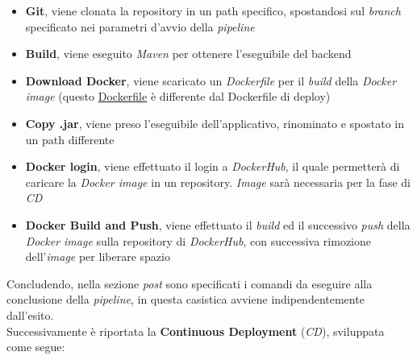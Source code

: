 \documentclass{article}
\begin{document}
\begin{itemize}[label = {-}]
    \itemsep0em
    \item \textbf{Git}, viene clonata la repository in un path specifico, spostandosi sul \textit{branch} specificato nei parametri d'avvio della \textit{pipeline}
    \item \textbf{Build}, viene eseguito \textit{Maven} per ottenere l'eseguibile del backend
    \item \textbf{Download Docker}, viene scaricato un \textit{Dockerfile} per il \textit{build} della \textit{Docker image} (questo \href{https://github.com/DavideDeRosa/storJ_SWE/blob/develop/CI_CD/Dockerfile}{Dockerfile} è differente dal Dockerfile di deploy)
    \item \textbf{Copy .jar}, viene preso l'eseguibile dell'applicativo, rinominato e spostato in un path differente
    \item \textbf{Docker login}, viene effettuato il login a \textit{DockerHub}, il quale permetterà di caricare la \textit{Docker image} in un repository. \textit{Image} sarà necessaria per la fase di \textit{CD}
    \item \textbf{Docker Build and Push}, viene effettuato il \textit{build} ed il successivo \textit{push} della \textit{Docker image} sulla repository di \textit{DockerHub}, con successiva rimozione dell'\textit{image} per liberare spazio
\end{itemize}
Concludendo, nella sezione \textit{post} sono specificati i comandi da eseguire alla conclusione della \textit{pipeline}, in questa casistica avviene indipendentemente dall'esito.\vspace*{7pt}\\
Successivamente è riportata la \textbf{Continuous Deployment} (\textit{CD}), sviluppata come segue:
\end{document}
